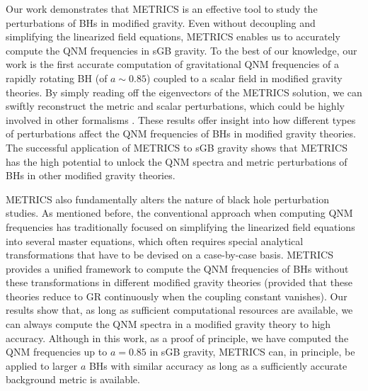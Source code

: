 \documentclass[aps,prx,amsmath,floats,floatfix,twocolumn,
  superscriptaddress,nofootinbib,showpacs]{revtex4-1}
\begin{document}
Our work demonstrates that METRICS is an effective tool to study the perturbations of BHs in modified gravity. 
Even without decoupling and simplifying the linearized field equations, METRICS enables us to accurately compute the QNM frequencies in sGB gravity.  
To the best of our knowledge, our work is the first accurate computation of gravitational QNM frequencies of a rapidly rotating BH (of $a \sim 0.85$) coupled to a scalar field in modified gravity theories.
By simply reading off the eigenvectors of the METRICS solution, we can swiftly reconstruct the metric and scalar perturbations, which could be highly involved in other formalisms \cite{Ripley:2020xby, isospectrality-paper}. 
These results offer insight into how different types of perturbations affect the QNM frequencies of BHs in modified gravity theories. 
The successful application of METRICS to sGB gravity shows that METRICS has the high potential to unlock the QNM spectra and metric perturbations of BHs in other modified gravity theories.

METRICS also fundamentally alters the nature of black hole perturbation studies. 
As mentioned before, the conventional approach when computing QNM frequencies has traditionally focused on simplifying the linearized field equations into several master equations, which often requires special analytical transformations that have to be devised on a case-by-case basis. 
METRICS provides a unified framework to compute the QNM frequencies of BHs without these transformations in different modified gravity theories (provided that these theories reduce to GR continuously when the coupling constant vanishes). 
Our results show that, as long as sufficient computational resources are available, we can always compute the QNM spectra in a modified gravity theory to high accuracy.
Although in this work, as a proof of principle, we have computed the QNM frequencies up to $a = 0.85$ in sGB gravity, METRICS can, in principle, be applied to larger $a$ BHs with similar accuracy as long as a sufficiently accurate background metric is available. 
\end{document}

